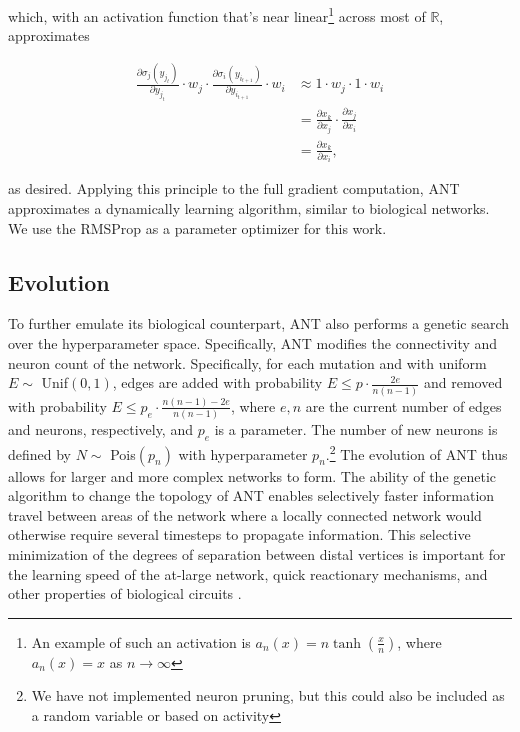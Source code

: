 \documentclass{article}
\begin{document}
\begin{multicols}{2}
	 \noindent which, with an activation function that's near linear\footnote{An example of such an activation is $a_n(x) = n\tanh(\frac{x}{n})$, where $a_n(x) = x$ as $n \rightarrow \infty$} across most of $\mathbb{R}$, approximates
	 
	 \begin{equation*}
	 	\begin{split}
	 		\frac{\partial \sigma_j(y_{j_{t}})}{\partial y_{j_{t}}} \cdot w_{j} \cdot \frac{\partial \sigma_i(y_{i_{t + 1}})}{\partial y_{i_{t + 1}}} \cdot w_{i} & \approx 1 \cdot w_{j} \cdot 1 \cdot w_{i} \\
	 		& = \frac{\partial x_{k}}{\partial x_{j}} \cdot \frac{\partial x_{j}}{\partial x_{i}} \\
	 		& = \frac{\partial x_{k}}{\partial x_{i}},
	 	\end{split}
	 \end{equation*}
	 
	 \noindent as desired. Applying this principle to the full gradient computation, ANT approximates a dynamically learning algorithm, similar to biological networks. We use the RMSProp \cite{hinton2018} as a parameter optimizer for this work.
	 
	 
	 
	 \subsection{Evolution}
	 
	 To further emulate its biological counterpart, ANT also performs a genetic search over the hyperparameter space. Specifically, ANT modifies the connectivity and neuron count of the network. Specifically, for each mutation and with uniform $E \sim $ Unif$(0, 1)$, edges are added with probability $E \leq p \cdot \frac{2e}{n(n - 1)}$ and removed with probability $E \leq p_e \cdot \frac{n(n - 1) - 2e}{n(n - 1)}$, where $e, n$ are the current number of edges and neurons, respectively, and $p_e$ is a parameter. The number of new neurons is defined by $N \sim $ Pois$(p_n)$ with hyperparameter $p_n$.\footnote{We have not implemented neuron pruning, but this could also be included as a random variable or based on activity} The evolution of ANT thus allows for larger and more complex networks to form. The ability of the genetic algorithm to change the topology of ANT enables selectively faster information travel between areas of the network where a locally connected network would otherwise require several timesteps to propagate information. This selective minimization of the degrees of separation between distal vertices is important for the learning speed of the at-large network, quick reactionary mechanisms, and other properties of biological circuits \cite{ananth2009} \cite{menzel2001}.
	 

\end{multicols}
\end{document}
